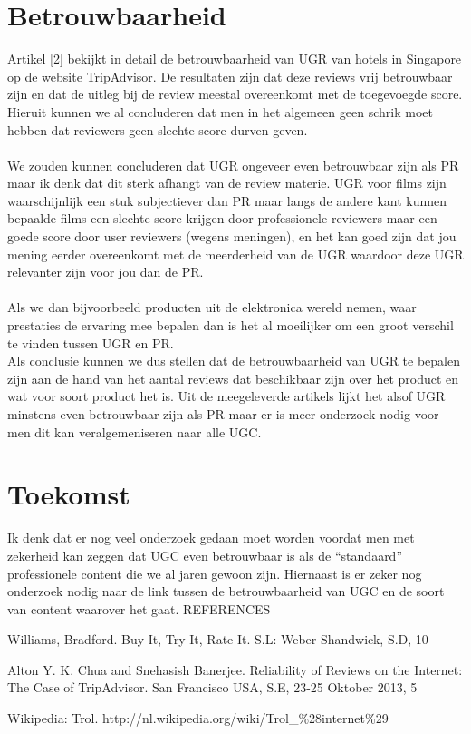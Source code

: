 \documentclass[a4paper]{article}
\begin{document}
\section{Betrouwbaarheid}
Artikel [2] bekijkt in detail de betrouwbaarheid van UGR van hotels in Singapore op de website TripAdvisor. De resultaten zijn dat deze reviews vrij betrouwbaar zijn en dat de uitleg bij de review meestal overeenkomt met de toegevoegde score. Hieruit kunnen we al concluderen dat men in het algemeen geen schrik moet hebben dat reviewers geen slechte score durven geven.\\\\
We zouden kunnen concluderen dat UGR ongeveer even betrouwbaar zijn als PR maar ik denk dat dit sterk afhangt van de review materie. UGR voor films zijn waarschijnlijk een stuk subjectiever dan PR maar langs de andere kant kunnen bepaalde films een slechte score krijgen door professionele reviewers maar een goede score door user reviewers (wegens meningen), en het kan goed zijn dat jou mening eerder overeenkomt met de meerderheid van de UGR waardoor deze UGR relevanter zijn voor jou dan de PR.\\\\
Als we dan bijvoorbeeld producten uit de elektronica wereld nemen, waar prestaties de ervaring mee bepalen dan is het al moeilijker om een groot verschil te vinden tussen UGR en PR.\\
Als conclusie kunnen we dus stellen dat de betrouwbaarheid van UGR te bepalen zijn aan de hand van het aantal reviews dat beschikbaar zijn over het product en wat voor soort product het is. Uit de meegeleverde artikels lijkt het alsof UGR minstens even betrouwbaar zijn als PR maar er is meer onderzoek nodig voor men dit kan veralgemeniseren naar alle UGC.
\newpage
\section{Toekomst}
Ik denk dat er nog veel onderzoek gedaan moet worden voordat men met zekerheid kan zeggen dat UGC even betrouwbaar is als de “standaard” professionele content die we al jaren gewoon zijn. Hiernaast is er zeker nog onderzoek nodig naar de link tussen de betrouwbaarheid van UGC en de soort van content waarover het gaat.
\newpage
REFERENCES
\begin{enumerate}[label={[\arabic*]}]
  \item Williams, Bradford. Buy It, Try It, Rate It. S.L: Weber Shandwick, S.D, 10
  \item Alton Y. K. Chua and Snehasish Banerjee. Reliability of Reviews on the Internet: The Case of TripAdvisor. San Francisco USA, S.E, 23-25 Oktober 2013, 5
  \item Wikipedia: Trol. http://nl.wikipedia.org/wiki/Trol\_\%28internet\%29
\end{enumerate}
\end{document}
